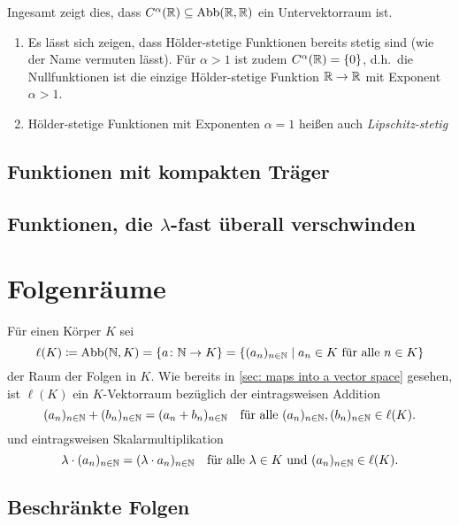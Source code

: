Ingesamt zeigt dies, dass $C^\alpha(\mathbb{R}) \subseteq \mathrm{Abb}(\mathbb{R}, \mathbb{R})$ ein Untervektorraum ist.

\begin{bem}
 \begin{enumerate}[leftmargin=*]
  \item
   Es lässt sich zeigen, dass Hölder-stetige Funktionen bereits stetig sind (wie der Name vermuten lässt). Für $\alpha > 1$ ist zudem $C^\alpha(\mathbb{R}) = \{0\}$, d.h.\ die Nullfunktionen ist die einzige Hölder-stetige Funktion $\mathbb{R} \to \mathbb{R}$ mit Exponent $\alpha > 1$.
  \item
   Hölder-stetige Funktionen mit Exponenten $\alpha = 1$ heißen auch \emph{Lipschitz-stetig}
 \end{enumerate}
\end{bem}



\subsection{Funktionen mit kompakten Träger}



\subsection{Funktionen, die \texorpdfstring{$\lambda$}{lambda}-fast überall verschwinden}





\section{Folgenräume}
Für einen Körper $K$ sei
\[
 \ell(K)
 \coloneqq \mathrm{Abb}(\mathbb{N}, K)
 = \{a \colon \mathbb{N} \to K\}
 = \{(a_n)_{n \in \mathbb{N}} \mid \text{$a_n \in K$ für alle $n \in K$}\}
\]
der Raum der Folgen in $K$. Wie bereits in \ref{sec: maps into a vector space} gesehen, ist $\ell(K)$ ein $K$-Vektorraum bezüglich der eintragsweisen Addition
\[
 (a_n)_{n \in \mathbb{N}} + (b_n)_{n \in \mathbb{N}} = (a_n + b_n)_{n \in \mathbb{N}}
 \quad
 \text{für alle $(a_n)_{n \in \mathbb{N}}, (b_n)_{n \in \mathbb{N}} \in \ell(K)$}.
\]
und eintragsweisen Skalarmultiplikation
\[
 \lambda \cdot (a_n)_{n \in \mathbb{N}}
 = (\lambda \cdot a_n)_{n \in \mathbb{N}}
 \quad
 \text{für alle $\lambda \in K$ und $(a_n)_{n \in \mathbb{N}} \in \ell(K)$}.
\]


\subsection{Beschränkte Folgen}


